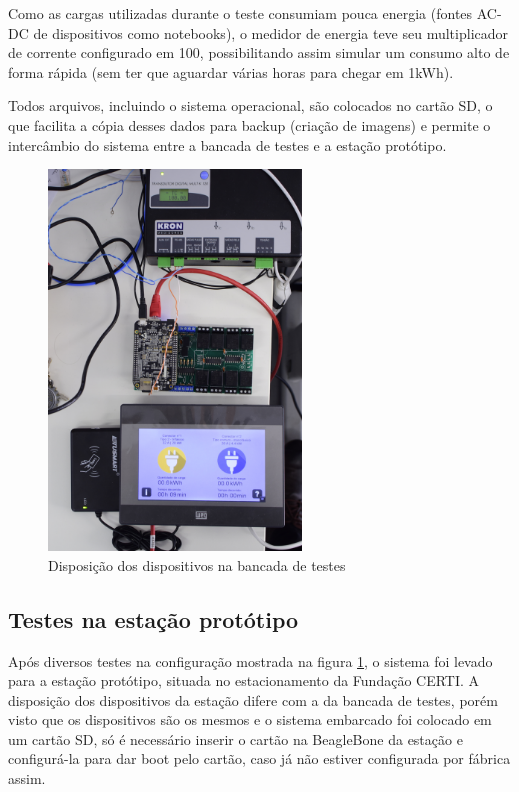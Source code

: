 Como as cargas utilizadas durante o teste consumiam pouca energia (fontes AC-DC de dispositivos como notebooks), o medidor de energia teve seu multiplicador de corrente configurado em 100, possibilitando assim simular um consumo alto de forma rápida (sem ter que aguardar várias horas para chegar em 1kWh).

Todos arquivos, incluindo o sistema operacional, são colocados no cartão SD, o que facilita a cópia desses dados para backup (criação de imagens) e permite o intercâmbio do sistema entre a bancada de testes e a estação protótipo.

\begin{figure}[H]
        \begin{center}
                \includegraphics[width=0.6\textwidth,natwidth=2130,natheight=1420,angle=-90]{assets/images/prototype-setup.jpg}
                \caption{Disposição dos dispositivos na bancada de testes}
                \label{fig:prototype-setup}
        \end{center}
\end{figure}

\subsection{Testes na estação protótipo}

Após diversos testes na configuração mostrada na figura \ref{fig:prototype-setup}, o sistema foi levado para a estação protótipo, situada no estacionamento da Fundação CERTI. A disposição dos dispositivos da estação difere com a da bancada de testes, porém visto que os dispositivos são os mesmos e o sistema embarcado foi colocado em um cartão SD, só é necessário inserir o cartão na BeagleBone da estação e configurá-la para dar boot pelo cartão, caso já não estiver configurada por fábrica assim.

